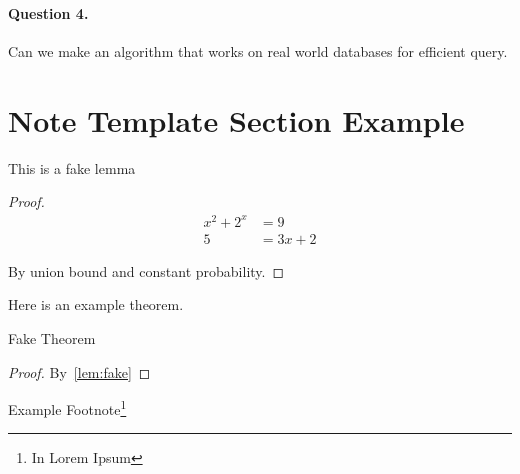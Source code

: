 \message{ !name(subgraph_iso_note.tex)}\documentclass[12pt]{article}
\begin{document}
\paragraph{Question 4.} Can we make an algorithm that works on real world databases for efficient query.

\section{Note Template Section Example}

\begin{lemma}\label{lem:fake}
	This is a fake lemma
\end{lemma}

\begin{proof}
	\begin{align*}
		x^{2} + 2^{x} & = 9      \\
		5             & = 3x + 2
	\end{align*}

	By union bound and constant probability.
\end{proof}

Here is an example theorem.

\begin{theorem}\label{thm:fake}
	Fake Theorem
\end{theorem}

\begin{proof}
	By~\cref{lem:fake}
\end{proof}

Example Footnote\footnote{In Lorem Ipsum}
\end{document}
